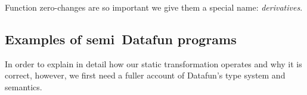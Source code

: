 Function zero-changes are so important we give them a special name:
\emph{derivatives}.







\subsection{Examples of semi\naive\ Datafun programs}
\XXX

In order to explain in detail how our static transformation operates and why it
is correct, however, we first need a fuller account of Datafun's type system and
semantics.
